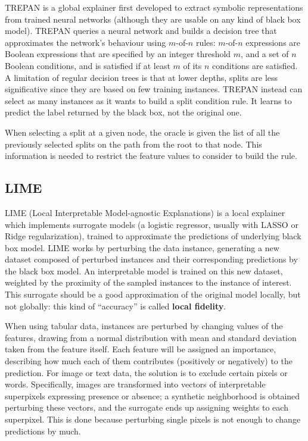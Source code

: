 TREPAN is a global explainer first developed to extract symbolic representations from trained neural networks (although they are usable on any kind of black box model). TREPAN queries a neural network and builds a decision tree that approximates the network's behaviour using $m$-of-$n$ rules: $m$-of-$n$ expressions are Boolean expressions that are specified by an integer threshold $m$, and a set of $n$ Boolean conditions, and is satisfied if at least $m$ of its $n$ conditions are satisfied. A limitation of regular decision trees is that at lower depths, splits are less significative since they are based on few training instances. TREPAN instead can select as many instances as it wants to build a split condition rule. It learns to predict the label returned by the black box, not the original one.

When selecting a split at a given node, the oracle is given the list of all the previously selected splits on the path from the root to that node. This information is needed to restrict the feature values to consider to build the rule. 

\subsection{LIME}

LIME (Local Interpretable Model-agnostic Explanations) is a local explainer which implements surrogate models (a logistic regressor, usually with LASSO or Ridge regularization), trained to approximate the predictions of underlying black box model. LIME works by perturbing the data instance, generating a new dataset composed of perturbed instances and their corresponding predictions by the black box model. An interpretable model is trained on this new dataset, weighted by the proximity of the sampled instances to the instance of interest. This surrogate should be a good approximation of the original model locally, but not globally: this kind of ``accuracy'' is called \textbf{local fidelity}.

When using tabular data, instances are perturbed by changing values of the features, drawing from a normal distribution with mean and standard deviation taken from the feature itself. Each feature will be assigned an importance, describing how much each of them contributes (positively or negatively) to the prediction. For image or text data, the solution is to exclude certain pixels or words. Specifically, images are transformed into vectors of interpretable superpixels expressing presence or absence; a synthetic neighborhood is obtained perturbing these vectors, and the surrogate ends up assigning weights to each superpixel. This is done because perturbing single pixels is not enough to change predictions by much. 

